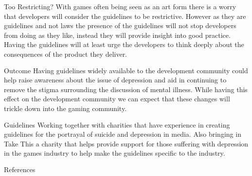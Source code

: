 \documentclass{beamer}
\begin{document}
\begin{frame}{Too Restricting?}
	With games often being seen as an art form\cite{pearce2006games} there is a worry that developers will consider the guidelines to be restrictive. However as they are guidelines and not laws the presence of the guidelines will not stop developers from doing as they like, instead they will provide insight into good practice. Having the guidelines will at least urge the developers to think deeply about the consequences of the product they deliver.
\end{frame}

\begin{frame}{Outcome}
	Having guidelines widely available to the development community could help raise awareness about the issue of depression and aid in continuing to remove the stigma surrounding the discussion of mental illness. While having this effect on the development community we can expect that these changes will trickle down into the gaming community.
\end{frame}

\begin{frame}{Guidelines}
Working together with charities that have experience in creating guidelines for the portrayal of suicide and depression in media\cite{world2017preventing}\cite{nepon2009media}. Also bringing in Take This\cite{TakeThis} a charity that helps provide support for those suffering with depression in the games industry to help make the guidelines specific to the industry.
\end{frame}

\begin{frame}[allowframebreaks]{References}
	
	
\end{frame}
\end{document}
